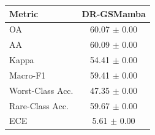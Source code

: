 \begin{tabular}{lc}
\hline
Metric & DR-GSMamba \\
\hline
OA & 60.07 $\pm$ 0.00 \\
AA & 60.09 $\pm$ 0.00 \\
Kappa & 54.41 $\pm$ 0.00 \\
Macro-F1 & 59.41 $\pm$ 0.00 \\
Worst-Class Acc. & 47.35 $\pm$ 0.00 \\
Rare-Class Acc. & 59.67 $\pm$ 0.00 \\
ECE & 5.61 $\pm$ 0.00 \\
\hline
\end{tabular}
